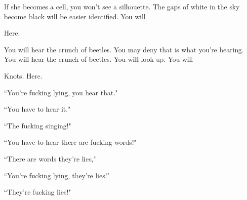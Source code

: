 \documentclass[11pt]{article}
\begin{document}
\vspace*{4\baselineskip}

\begingroup
If she becomes a cell, you won't see a silhouette. The gaps of white in the sky become black will be easier identified. You will 
\endgroup

\vspace*{4\baselineskip}

\begingroup
\begin{center}
Here.
\rightskip\leftskip
\end{center}
\endgroup

\vspace*{4\baselineskip}

\begingroup
You will hear the crunch of beetles. You may deny that is what you're hearing. You will hear the crunch of beetles. You will look up. You will
\endgroup

\vspace*{4\baselineskip}

\begingroup
\begin{center}
Knots. Here.
\rightskip\leftskip
\end{center}
\endgroup

\vspace*{4\baselineskip}

\begingroup
\begin{center}
``You're fucking lying, you hear that."
\end{center}
\endgroup

\begingroup
\begin{center}
``You have to hear it."
\end{center}
\endgroup

\begingroup
\begin{center}
``The fucking singing!"
\end{center}
\endgroup

\begingroup
\begin{center}
``You have to hear there are fucking words!"
\end{center}
\endgroup

\begingroup
\begin{center}
``There are words they're lies,"
\end{center}
\endgroup

\begingroup
\begin{center}
``You're fucking lying, they're lies!"
\end{center}
\endgroup

\begingroup
\begin{center}
``They're fucking lies!"
\end{center}
\endgroup
\end{document}
